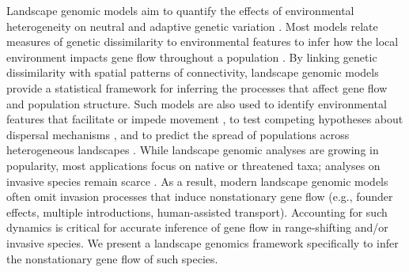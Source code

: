 \documentclass{article}
\begin{document}
Landscape genomic models aim to quantify the effects of environmental heterogeneity on neutral and adaptive genetic variation \citep{schwartz2010landscape}. Most models relate measures of genetic dissimilarity to environmental features to infer how the local environment impacts gene flow throughout a population \citep[e.g.,][]{hanks2013circuit,schwob2024composite}.
By linking genetic dissimilarity with spatial patterns of connectivity, landscape genomic models provide a statistical framework for inferring the processes that affect gene flow and population structure.
Such models are also used to identify environmental features that facilitate or impede movement \citep[i.e., corridors or barriers;][]{peterson2019spatially,white2020novel}, to test competing hypotheses about dispersal mechanisms \citep{aitken2024conserving}, and to predict the spread of populations across heterogeneous landscapes \citep{schwartz2010landscape}. While landscape genomic analyses are growing in popularity, most applications focus on native or threatened taxa; analyses on invasive species remain scarce \citep{briscoe2024isolation,kolodziejczyk2025genomic}. As a result, modern landscape genomic models often omit invasion processes that induce nonstationary gene flow (e.g., founder effects, multiple introductions, human-assisted transport). Accounting for such dynamics is critical for accurate inference of gene flow in range-shifting and/or invasive species. We present a landscape genomics framework specifically to infer the nonstationary gene flow of such species. 

\end{document}
